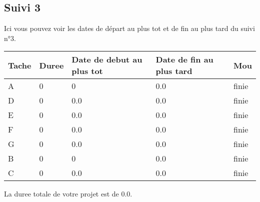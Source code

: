 \documentclass{article}
\begin{document}
\subsection{Suivi 3}
Ici vous pouvez voir les dates de départ au plus tot et de fin au plus tard du suivi n°3. \\
\begin{tabular}{|l|l|l|l|l|}
\hline 
Tache & Duree & Date de debut au plus tot & Date de fin au plus tard & Mou\tabularnewline
\hline

A&0 &0&0.0&finie\tabularnewline
\hline
D&0 &0.0&0.0&finie\tabularnewline
\hline
E&0 &0.0&0.0&finie\tabularnewline
\hline
F&0 &0.0&0.0&finie\tabularnewline
\hline
G&0 &0.0&0.0&finie\tabularnewline
\hline
B&0 &0&0.0&finie\tabularnewline
\hline
C&0 &0.0&0.0&finie\tabularnewline
\hline

\end{tabular}
La duree totale de votre projet est de 0.0.
\end{document}
